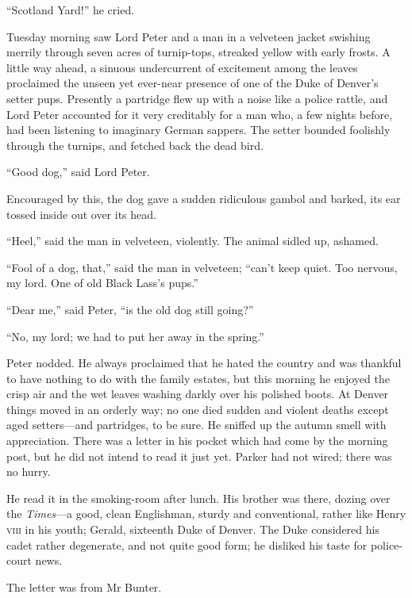 \enquote{Scotland Yard!} he cried.

Tuesday morning saw Lord Peter and a man in a velveteen jacket swishing merrily through seven acres of turnip-tops, streaked yellow with early frosts. A little way ahead, a sinuous undercurrent of excitement among the leaves proclaimed the unseen yet ever-near presence of one of the Duke of Denver’s setter pups. Presently a partridge flew up with a noise like a police rattle, and Lord Peter accounted for it very creditably for a man who, a few nights before, had been listening to imaginary German sappers. The setter bounded foolishly through the turnips, and fetched back the dead bird.

\enquote{Good dog,} said Lord Peter.

Encouraged by this, the dog gave a sudden ridiculous gambol and barked, its ear tossed inside out over its head.

\enquote{Heel,} said the man in velveteen, violently. The animal sidled up, ashamed.

\enquote{Fool of a dog, that,} said the man in velveteen; \enquote{can’t keep quiet. Too nervous, my lord. One of old Black Lass’s pups.}

\enquote{Dear me,} said Peter, \enquote{is the old dog still going?}

\enquote{No, my lord; we had to put her away in the spring.}

Peter nodded. He always proclaimed that he hated the country and was thankful to have nothing to do with the family estates, but this morning he enjoyed the crisp air and the wet leaves washing darkly over his polished boots. At Denver things moved in an orderly way; no one died sudden and violent deaths except aged setters\allowbreak---\allowbreak and partridges, to be sure. He sniffed up the autumn smell with appreciation. There was a letter in his pocket which had come by the morning post, but he did not intend to read it just yet. Parker had not wired; there was no hurry.

He read it in the smoking-room after lunch. His brother was there, dozing over the \textit{Times}---a good, clean Englishman, sturdy and conventional, rather like Henry \textsc{viii} in his youth; Gerald, sixteenth Duke of Denver. The Duke considered his cadet rather degenerate, and not quite good form; he disliked his taste for police-court news.

The letter was from Mr Bunter.

